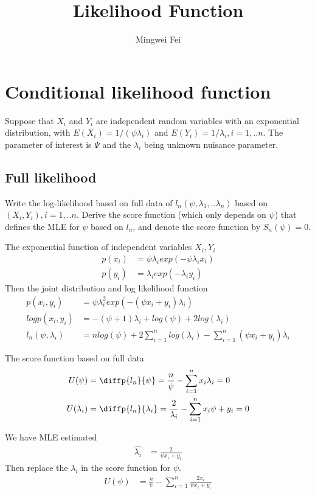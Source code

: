 \documentclass[11pt]{article} %
\title{Likelihood Function}
\author{Mingwei Fei}
\begin{document}
	
	\maketitle
	
	\section{Conditional likelihood function}
	Suppose that $X_i$ and $Y_i$ are independent random variables with an exponential distribution, with $E(X_i) = 1/(\psi \lambda_i)$ and $E(Y_i) = 1/\lambda_i, i=1,..n$. The parameter of interest is $\Psi$ and the $\lambda_i$ being unknown nuisance parameter.
	
	\subsection{Full likelihood}
	Write the log-likelihood based on full data of $l_n(\psi, \lambda_1,.. \lambda_n)$ based on $(X_i, Y_i), i=1,..n$. Derive the score function (which only depends on $\psi$) that defines the MLE for $\psi$ based on $l_n$, and denote the score function by $S_n(\psi) = 0$.
	
	The exponential function of independent variables $ X_i, Y_i$
	\begin{align*}
		p(x_i) &= {\psi \lambda_i} exp(-{\psi \lambda_i}x_i) \\
		p(y_i) &= { \lambda_i} exp(- \lambda_i y_i)
	\end{align*}	
	Then the joint distribution and log likelihood function
	\begin{align*}
	p(x_i, y_i) &= {\psi \lambda_i^2} exp(-{(\psi x_i + y_i) \lambda_i}) \\
	log p(x_i, y_i) &= -{(\psi + 1) \lambda_i} + log (\psi) + 2 log (\lambda_i)\\
	l_n(\psi, \lambda_i) &= n log(\psi) + 2 \sum_{i=1}^n log (\lambda_i) - \sum_{i=1}^n (\psi x_i + y_i) \lambda_i
	\end{align*}	

	The score function based on full data
	\begin{align*}
	U(\psi) &= \diffp{l_n}{\psi} = \frac{n}{\psi} - \sum_{i=1}^n x_i \lambda_i = 0 \\
	U(\lambda_i) &= \diffp{l_n}{{\lambda_i}} = \frac{2}{\lambda_i} - \sum_{i=1}^n x_i \psi + y_i = 0 
	\end{align*}
	
	We have MLE estimated 
	\begin{align*}
	\hat{\lambda_i} &= \frac{2}{\psi x_i + y_i} 
	\end{align*}
	Then replace the $\lambda_i$ in the score function for $\psi$.
	\begin{align*}
	U(\psi) &= \frac{n}{\psi} - \sum_{i=1}^n  \frac{2 x_i}{\psi x_i + y_i} 
	\end{align*}	
	
\end{document}
